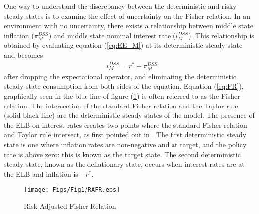 \documentclass[11pt]{article}
\begin{document}
	One way to understand the discrepancy between the deterministic and risky steady states is to examine the effect of uncertainty on the Fisher relation. In an environment with no uncertainty, there exists a relationship between middle state inflation ($\pi_M^{DSS}$) and middle state nominal interest rate ($i_M^{DSS}$). This relationship is obtained by evaluating equation (\ref{eq:EE_M}) at its deterministic steady state and becomes
	\begin{align}
		& i_M^{DSS} =  r^* + \pi_M^{DSS} \label{eq:FR}
	\end{align}
	after dropping the expectational operator, and eliminating the deterministic steady-state consumption from both sides of the equation. Equation (\ref{eq:FR}), graphically seen in the blue line of figure (\ref{fig:RAFR}) is often referred to as the Fisher relation. The intersection of the standard Fisher relation and the Taylor rule (solid black line) are the deterministic steady states of the model. The presence of the ELB on interest rates creates two points where the standard Fisher relation and Taylor rule intersect, as first pointed out in \citet{BenhabibSchmittGroheUribe2002}. The first deterministic steady state is one where inflation rates are non-negative and at target, and the policy rate is above zero: this is known as the target state. The second deterministic steady state, known as the deflationary state, occurs when interest rates are at the ELB and inflation is $-r^*$. 
	
	\begin{figure}[!ht]
		\begin{center}
			\caption{Risk Adjusted Fisher Relation}
			\texttt{[image: Figs/Fig1/RAFR.eps]}\label{fig:RAFR}
		\end{center}
	\end{figure}
	
\end{document}
